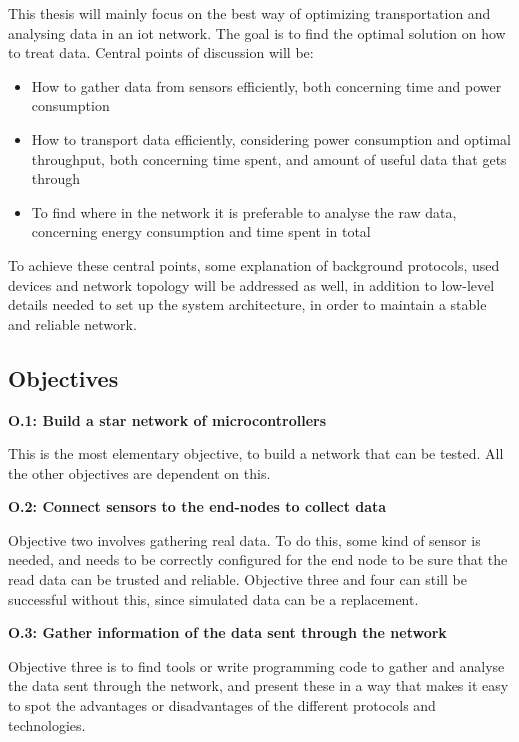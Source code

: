 \noindent This thesis will mainly focus on the best way of optimizing transportation and analysing data in an \gls{iot} network. The goal is to find the optimal solution on how to treat data. Central points of discussion will be:

\begin{itemize}
	\item How to gather data from sensors efficiently, both concerning time and power consumption
	\item How to transport data efficiently, considering power consumption and optimal throughput, both concerning time spent, and amount of useful data that gets through
	\item To find where in the network it is preferable to analyse the raw data, concerning energy consumption and time spent in total
\end{itemize}

\noindent To achieve these central points, some explanation of background protocols, used devices and network topology will be addressed as well, in addition to low-level details needed to set up the system architecture, in order to maintain a stable and reliable network. 


\subsection{Objectives}

\noindent \textbf{O.1: Build a star network of \glspl{microcontroller}}

\noindent This is the most elementary objective, to build a network that can be tested. All the other objectives are dependent on this.  

\noindent\textbf{O.2: Connect sensors to the end-nodes to collect data}

\noindent Objective two involves gathering real data. To do this, some kind of sensor is needed, and needs to be correctly configured for the end node to be sure that the read data can be trusted and reliable. Objective three and four can still be successful without this, since simulated data can be a replacement.  

\noindent\textbf{O.3: Gather information of the data sent through the network}

\noindent Objective three is to find tools or write programming code to gather and analyse the data sent through the network, and present these in a way that makes it easy to spot the advantages or disadvantages of the different protocols and technologies. 

